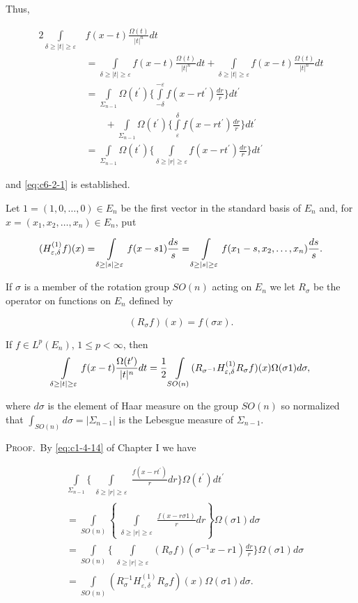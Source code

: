 Thus,

\[
\begin{aligned}2\int\limits_{\delta\geq|t|\geq\varepsilon}&f(x-t)\frac{\Omega(t)}{|t|^{n}}dt\\&=\int\limits_{\delta\geq|t|\geq\varepsilon}f(x-t)\frac{\Omega(t)}{|t|^{n}}dt+\int\limits_{\delta\geq|t|\geq\varepsilon}f(x-t)\frac{\Omega(t)}{|t|^{n}}dt\\&=\int\limits_{\Sigma_{n-1}}\Omega(t^{\prime})\Biggl\{\int\limits_{-\delta}^{-\varepsilon}f(x-rt^{\prime})\frac{dr}{r}\Biggr\}dt^{\prime}\\&\qquad+\int\limits_{\Sigma_{n-1}}\Omega(t^{\prime})\Biggl\{\int\limits_{\varepsilon}^{\delta}f(x-rt^{\prime})\frac{dr}{r}\Biggr\}dt^{\prime}\\&=\int\limits_{\Sigma_{n-1}}\Omega(t^{\prime})\Biggl\{\int\limits_{\delta\geq|r|\geq\varepsilon}f(x-rt^{\prime})\frac{dr}{r}\Biggr\}dt^{\prime}\end{aligned}
\]

and \eqref{eq:c6-2-1} is established.

Let $1 = (1, 0, \ldots, 0) \in E_n$ be the first vector in the standard basis of $E_n$ and, for $x = (x_1, x_2, \ldots, x_n) \in E_n$, put

\[
(H_{\varepsilon,\delta}^{(1)}f)(x)=\intop_{\delta\ge|s|\ge\varepsilon}f(x-s1)\frac{d s}{s}=\intop_{\delta\ge|s|\ge\varepsilon}f(x_{1}-s,x_{2},\ldots,x_{n})\frac{d s}{s}.
\]

If $\sigma$ is a member of the rotation group $SO(n)$ acting on $E_n$ we let $R_\sigma$ be the operator on functions on $E_n$ defined by

\[
(R_{\sigma}f)(x)=f(\sigma x).
\]

\begin{lemma}
\label{lem:c6-2-2}
If $f \in L^{p}(E_{n})$, $1 \leq p < \infty$, then
\[
\intop_{\substack{\delta\geq|t|\geq\varepsilon}}f(x-t)\frac{\Omega(t^{\prime})}{|t|^{n}}d t=\frac{1}{2}\intop_{S O(n)}(R_{\sigma^{-1}}H_{\varepsilon,\delta}^{(1)}R_{\sigma}f)(x)\Omega(\sigma1)d\sigma,
\]

where $d\sigma$ is the element of Haar measure on the group $SO(n)$ so normalized that $\int_{SO(n)} d\sigma = |\Sigma_{n-1}|$ is the Lebesgue measure of $\Sigma_{n-1}$.
\end{lemma}

\textsc{Proof.}\ By \eqref{eq:c1-4-14} of Chapter I we have

\[
\begin{aligned}&\int\limits_{\Sigma_{n-1}}\Bigg\{\int\limits_{\substack{\delta\geq|r|\geq\varepsilon}}\frac{f(x-rt^{\prime})}{r}dr\Bigg\}\Omega(t^{\prime})dt^{\prime}\\&=\int\limits_{SO(n)}\left\{\int\limits_{\substack{\delta\geq|r|\geq\varepsilon}}\frac{f(x-r\sigma1)}{r}dr\right\}\Omega(\sigma1)d\sigma\\&=\int\limits_{SO(n)}\Bigg\{\int\limits_{\substack{\delta\geq|r|\geq\varepsilon}}(R_\sigma f)(\sigma^{-1}x-r1)\frac{dr}{r}\Bigg\}\Omega(\sigma1)d\sigma\\&=\int\limits_{SO(n)}(R_\sigma^{-1}H^{(1)}_{\varepsilon,\delta}R_\sigma f)(x)\Omega(\sigma1)d\sigma.\end{aligned}
\]

